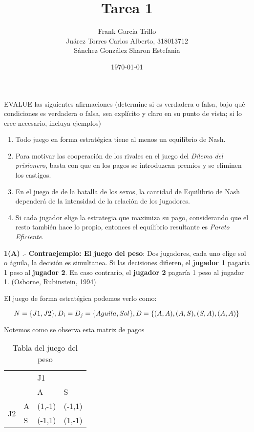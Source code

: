 \documentclass{homework}
\author{Frank Garcia Trillo\\
Juárez Torres Carlos Alberto,   318013712\\
Sánchez González Sharon Estefania}
\date{\today}
\title{Tarea 1}
\begin{document}
 \maketitle


\question EVALUE las siguientes afirmaciones (determine si es verdadera o falsa, bajo qué condiciones es verdadera o falsa, sea explícito y claro en su punto de vista; si lo cree necesario, incluya ejemplos)

\begin{enumerate}
    \item Todo juego en forma estratégica tiene al menos un equilibrio de Nash.
    \item Para motivar las cooperación de los rivales en el juego del \textit{Dilema del prisionero}, basta con que en los pagos se introduzcan premios y se eliminen los castigos.
    \item En el juego de de la batalla de los sexos, la cantidad de Equilibrio de Nash dependerá de la intensidad de la relación de los jugadores.
    \item Si cada jugador elige la estrategia que maximiza su pago, considerando que el resto también hace lo propio, entonces el equilibrio resultante es \textit{Pareto Eficiente}.
\end{enumerate}


\textbf{1(A)} .- \textbf{Contraejemplo: El juego del peso}:
Dos jugadores, cada uno elige sol o águila, la decisión es simultanea. Si las decisiones difieren, el \textbf{jugador 1} pagaría 1 peso al \textbf{jugador 2}. En caso contrario, el \textbf{jugador 2} pagaría 1 peso al jugador 1. (Osborne, Rubinstein, 1994)

El juego de forma estratégica podemos verlo como:

\begin{equation}
    N = \{ J1, J2 \},  \\
    D_i = D_j = \{ Aguila, Sol \},  \\
    D = \{ (A,A), (A,S), (S,A), (A,A) \} 
\end{equation}

Notemos como se observa esta matriz de pagos
    

\begin{table}[h!]
\begin{tabular}{|ll|ll|}
\hline
\multicolumn{2}{|l|}{\multirow{2}{*}{}} & \multicolumn{2}{l|}{J1} \\ \cline{3-4} 
\multicolumn{2}{|l|}{} & \multicolumn{1}{l|}{A} & S \\ \hline
\multicolumn{1}{|c|}{\multirow{2}{*}{J2}} & A & \multicolumn{1}{l|}{(1,-1)} & (-1,1) \\ \cline{2-4} 
\multicolumn{1}{|c|}{} & S & \multicolumn{1}{l|}{(-1,1)} & (1,-1) \\ \hline
\end{tabular}
\caption{Tabla del juego del peso}
\end{table}
\end{document}
